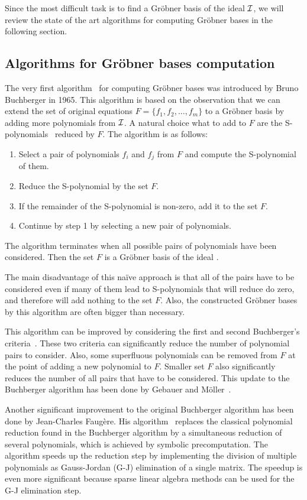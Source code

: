 Since the most difficult task is to find a Gr\"obner basis of the ideal $\mathcal{I}$, we will review the state of the art algorithms for computing Gr\"obner bases in the following section.

\subsection{Algorithms for Gr\"obner bases computation}
The very first algorithm~\cite{Buchberger} for computing Gr\"obner bases was introduced by Bruno Buchberger in 1965.
This algorithm is based on the observation that we can extend the set of original equations $F = \{f_1, f_2, \ldots, f_m\}$ to a Gr\"obner basis by adding more polynomials from $\mathcal{I}$.
A natural choice what to add to $F$ are the S-polynomials~\cite{Becker93} reduced by $F$.
The algorithm is as follows:
\begin{enumerate}
  \item Select a pair of polynomials $f_i$ and $f_j$ from $F$ and compute the S-polynomial of them.
  \item Reduce the S-polynomial by the set $F$.
  \item If the remainder of the S-polynomial is non-zero, add it to the set $F$.
  \item Continue by step 1 by selecting a new pair of polynomials.
\end{enumerate}
The algorithm terminates when all possible pairs of polynomials have been considered. Then the set $F$ is a Gr\"obner basis of the ideal \Ideal.

The main disadvantage of this na\"ive approach is that all of the pairs have to be considered even if many of them lead to S-polynomials that will reduce do zero, and therefore will add nothing to the set $F$.
Also, the constructed Gr\"obner bases by this algorithm are often bigger than necessary.

This algorithm can be improved by considering the first and second Buchberger's criteria~\cite{Becker93}.
These two criteria can significantly reduce the number of polynomial pairs to consider.
Also, some superfluous polynomials can be removed from $F$ at the point of adding a new polynomial to $F$.
Smaller set $F$ also significantly reduces the number of all pairs that have to be considered.
This update to the Buchberger algorithm has been done by Gebauer and M\"oller~\cite{Gebauer-Moller88}.

Another significant improvement to the original Buchberger algorithm has been done by Jean-Charles Faug\`ere.
His \FFFF{} algorithm~\cite{F4} replaces the classical polynomial reduction found in the Buchberger algorithm by a simultaneous reduction of several polynomials, which is achieved by symbolic precomputation.
The \FFFF{} algorithm speeds up the reduction step by implementing the division of multiple polynomials as Gauss-Jordan (G-J) elimination of a single matrix.
The speedup is even more significant because sparse linear algebra methods can be used for the G-J elimination step.

